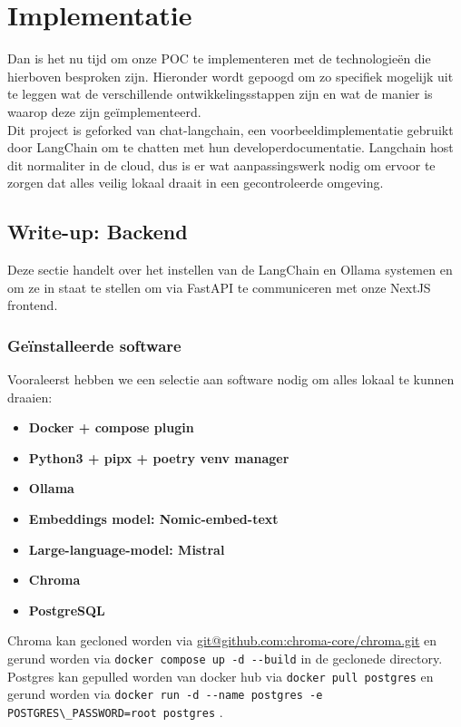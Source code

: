 \chapter{Implementatie}
\label{ch:implementation}
Dan is het nu tijd om onze POC te implementeren met de technologieën die hierboven besproken zijn.
Hieronder wordt gepoogd om zo specifiek mogelijk uit te leggen wat de verschillende ontwikkelingsstappen zijn en wat de manier is waarop deze zijn geïmplementeerd.\\

Dit project is geforked van chat-langchain, een voorbeeldimplementatie gebruikt door LangChain om te chatten met hun developerdocumentatie.
Langchain host dit normaliter in de cloud, dus is er wat aanpassingswerk nodig om ervoor te zorgen dat alles veilig lokaal draait in een gecontroleerde omgeving.

\newpage
\section{Write-up: Backend}
Deze sectie handelt over het instellen van de LangChain en Ollama systemen en om ze in staat te stellen om via FastAPI te communiceren met onze NextJS frontend.

\subsection{Geïnstalleerde software}
Vooraleerst hebben we een selectie aan software nodig om alles lokaal te kunnen draaien:
\begin{itemize}
	\item \textbf{Docker + compose plugin}
	\item \textbf{Python3 + pipx + poetry venv manager}
	\item \textbf{Ollama}
	\item \textbf{Embeddings model: Nomic-embed-text}
	\item \textbf{Large-language-model: Mistral}
	\item \textbf{Chroma}
	\item \textbf{PostgreSQL}
\end{itemize}

Chroma kan gecloned worden via \url{git@github.com:chroma-core/chroma.git} en gerund worden via \lstinline{docker compose up -d --build} in de geclonede directory. \\
Postgres kan gepulled worden van docker hub via \lstinline{docker pull postgres} en gerund worden via \lstinline{docker run -d --name postgres -e POSTGRES\_PASSWORD=root postgres} . \\

